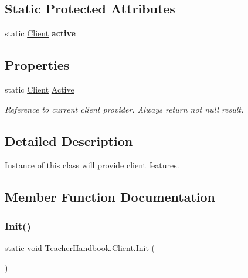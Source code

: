 \subsection*{Static Protected Attributes}
\begin{DoxyCompactItemize}
\item 
\mbox{\label{class_teacher_handbook_1_1_client_aaa6bae79ce27b06ba243b4b87f1822a5}} 
static \mbox{\hyperlink{class_teacher_handbook_1_1_client}{Client}} {\bfseries active}
\end{DoxyCompactItemize}
\subsection*{Properties}
\begin{DoxyCompactItemize}
\item 
static \mbox{\hyperlink{class_teacher_handbook_1_1_client}{Client}} \mbox{\hyperlink{class_teacher_handbook_1_1_client_a403583a80a8d5040410c4f1f180aafad}{Active}}
\begin{DoxyCompactList}\small\item\em Reference to current client provider. Always return not null result. \end{DoxyCompactList}\end{DoxyCompactItemize}


\subsection{Detailed Description}
Instance of this class will provide client features. 



\subsection{Member Function Documentation}
\mbox{\label{class_teacher_handbook_1_1_client_a8cf998f202069ab5bbbfcdc779e4af29}} 
\subsubsection{\texorpdfstring{Init()}{Init()}}
{\footnotesize\ttfamily static void Teacher\+Handbook.\+Client.\+Init (\begin{DoxyParamCaption}{ }\end{DoxyParamCaption})\hspace{0.3cm}{\ttfamily [static]}}



